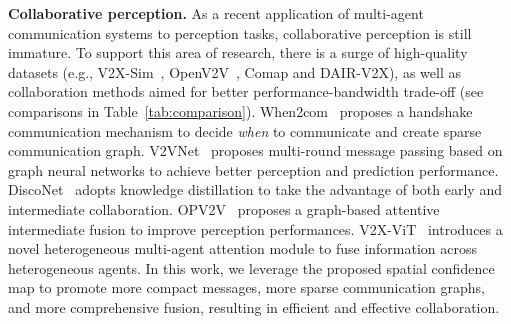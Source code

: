 \textbf{Collaborative perception.}
As a recent application of multi-agent communication systems to perception tasks, collaborative perception is still immature. To support this area of research, there is a surge of high-quality datasets (e.g., V2X-Sim~\cite{V2XSim}, OpenV2V~\cite{OPV2V}, Comap\cite{comap} and DAIR-V2X\cite{dair}), as well as collaboration methods aimed for better performance-bandwidth trade-off (see comparisons in Table~\ref{tab:comparison}). When2com~\cite{when2com} proposes a handshake communication mechanism to decide \textit{when} to communicate and create sparse communication graph. V2VNet~\cite{v2vnet} proposes multi-round message passing based on graph neural networks to achieve better perception and prediction performance. DiscoNet~\cite{disconet} adopts knowledge distillation to take the advantage of both early and intermediate collaboration. OPV2V~\cite{OPV2V} proposes a graph-based attentive intermediate fusion to improve perception performances. V2X-ViT~\cite{xu2022v2x} introduces a novel heterogeneous multi-agent attention module to fuse information across heterogeneous agents. In this work, we leverage the proposed spatial confidence map to promote more compact messages, more sparse communication graphs, and more comprehensive fusion, resulting in efficient and effective collaboration. 
